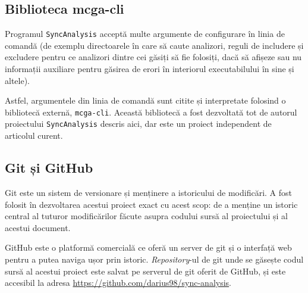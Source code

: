 \subsection{Biblioteca mcga-cli}

Programul \lstinline{SyncAnalysis} acceptă multe argumente de
configurare în linia de comandă (de exemplu directoarele în care să
caute analizori, reguli de includere și excludere pentru ce analizori
dintre cei găsiți să fie folosiți, dacă să afișeze sau nu informații
auxiliare pentru găsirea de erori în interiorul executabilului în sine
și altele).

Astfel, argumentele din linia de comandă sunt citite și interpretate
folosind o bibliotecă externă, \lstinline{mcga-cli}\cite{mcga-cli}.
Această bibliotecă a fost dezvoltată tot de autorul proiectului
\lstinline{SyncAnalysis} descris aici, dar este un proiect independent
de articolul curent.

\subsection{Git și GitHub}

Git\cite{git} este un sistem de versionare și menținere a istoricului de
modificări. A fost folosit în dezvoltarea acestui proiect exact cu acest
scop: de a menține un istoric central al tuturor modificărilor făcute
asupra codului sursă al proiectului și al acestui document.

GitHub\cite{GitHub} este o platformă comercială ce oferă un server de
git și o interfață web pentru a putea naviga ușor prin istoric.
\textit{Repository}-ul de git unde se găsește codul sursă al acestui
proiect este salvat pe serverul de git oferit de GitHub, și este
accesibil la adresa \url{https://github.com/darius98/sync-analysis}.
